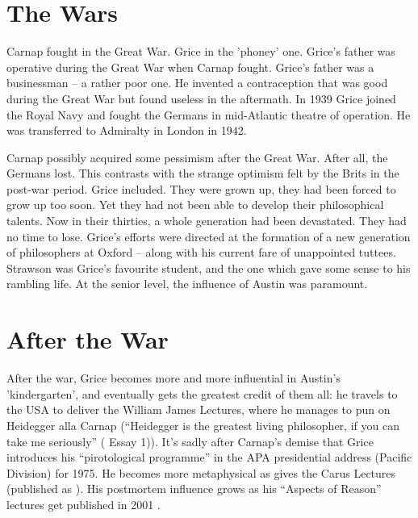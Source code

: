 \documentclass[10pt,titlepage]{book}
\begin{document}
\section{The Wars}

Carnap fought in the Great War.
Grice in the 'phoney' one. Grice's father  
was operative during the Great War when Carnap fought.
Grice's father was a businessman -- a rather poor one.
He invented a contraception that was good during the Great War but found useless in the aftermath.
In 1939 Grice joined the Royal Navy and fought the Germans in mid-Atlantic theatre of operation.
He was transferred to Admiralty in London in 1942. 
 
Carnap possibly acquired some pessimism after the Great War.
After all, the Germans lost.
This contrasts with the strange optimism felt by the Brits in the post-war period.
Grice included.
They were grown up, they had been forced to grow up too soon.
Yet they had not been able to develop their philosophical talents.
Now in their thirties, a whole generation had been devastated.
They had no time to lose.
Grice's efforts were directed at the formation of a new generation of philosophers at Oxford -- along with his  
current fare of unappointed tuttees.
Strawson was Grice's favourite student, and the one which gave some sense to his rambling life.
At the senior level, the influence of Austin was paramount.

\section{After the War}

After the war, Grice becomes more and more influential in Austin's  'kindergarten', and eventually gets the greatest credit of them all: he travels to the USA to deliver the William James Lectures, where he manages to pun on Heidegger alla Carnap (``Heidegger is the greatest living philosopher, if you can take me seriously''  (\cite{grice89} Essay 1)).
It’s sadly after Carnap’s demise that Grice introduces his ``pirotological programme'' in the APA presidential address (Pacific Division) for 1975.
He becomes more metaphysical as gives the Carus Lectures (published as \cite{grice91}).
His postmortem influence grows as his ``Aspects of Reason'' lectures get published in 2001 \cite{grice01}. 
\end{document}
